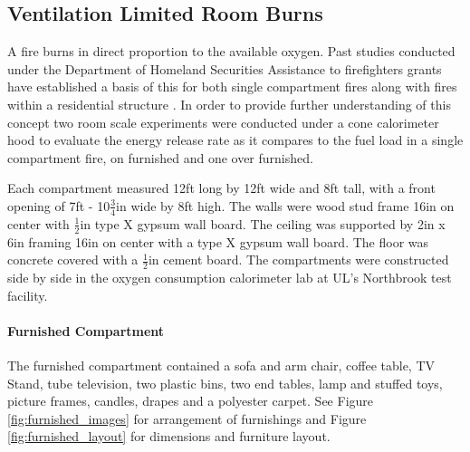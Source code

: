 \documentclass{article}
\begin{document}
\subsection{Ventilation Limited Room Burns}
A fire burns in direct proportion to the available oxygen. Past studies conducted under the Department of Homeland Securities Assistance to firefighters grants have established a basis of this for both single compartment fires along with fires within a residential structure \cite{DHS2008} \cite{DHS2010}. In order to provide further understanding of this concept two room scale experiments were conducted under a cone calorimeter hood to evaluate the energy release rate as it compares to the fuel load in a single compartment fire, on furnished and one over furnished.

Each compartment measured 12ft long by 12ft wide and 8ft tall, with a front opening of 7ft - 10$\frac{3}{4}$in wide by 8ft high. The walls were wood stud frame 16in on center with $\frac{1}{2}$in type X gypsum wall board. The ceiling was supported by 2in x 6in framing 16in on center with a type X gypsum wall board. The floor was concrete covered with a $\frac{1}{2}$in cement board. The compartments were constructed side by side in the oxygen consumption calorimeter lab at UL's Northbrook test facility. 

\paragraph{Furnished Compartment} \mbox{}

The furnished compartment contained a sofa and arm chair, coffee table, TV Stand, tube television, two plastic bins, two end tables, lamp and stuffed toys, picture frames, candles, drapes and a polyester carpet. See Figure \ref{fig:furnished_images} for arrangement of furnishings and Figure \ref{fig:furnished_layout} for dimensions and furniture layout.
\end{document}

